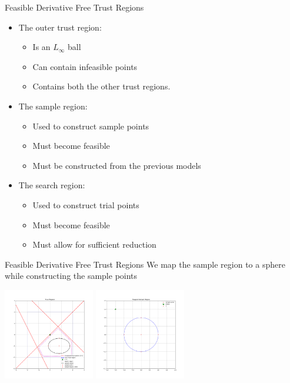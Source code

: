 \documentclass{beamer}
\begin{document}
\begin{frame}{Feasible Derivative Free Trust Regions}
	\begin{itemize}
		\item The outer trust region:
			\begin{itemize}
				\item Is an $L_{\infty}$ ball
				\item Can contain infeasible points
				\item Contains both the other trust regions.
			\end{itemize}
		\item The sample region:
			\begin{itemize}
				\item Used to construct sample points
				\item Must become feasible
				\item Must be constructed from the previous models
			\end{itemize}
		\item The search region:
			\begin{itemize}
				\item Used to construct trial points
				\item Must become feasible
				\item Must allow for sufficient reduction
			\end{itemize}
	\end{itemize}
\end{frame}

\begin{frame}{Feasible Derivative Free Trust Regions}
	We map the sample region to a sphere while constructing the sample points
	\begin{center}
		\includegraphics[width=150px]{images/all_regions_1.png}
		\includegraphics[width=150px]{images/all_regions_2.png}
	\end{center}
\end{frame}
\end{document}
